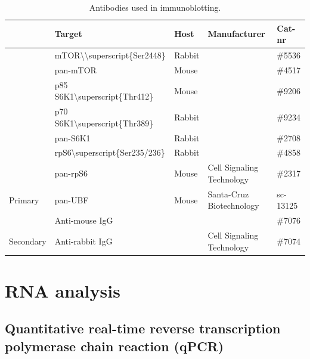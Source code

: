 \documentclass[twoside,10pt]{gihclass} %
\begin{document}
\begin{table}

\caption{\label{tab:primary-antibodies-table}Antibodies used in immunoblotting.}
\centering
\fontsize{7}{9}\selectfont
\begin{tabular}[t]{lllll}
\toprule
 & Target & Host & Manufacturer & Cat-nr\\
\midrule
 & mTOR\textbackslash{}\textbackslash{}superscript\{Ser2448\} & Rabbit &  & \#5536\\

 & pan-mTOR & Mouse &  & \#4517\\

 & p85 S6K1\textbackslash{}superscript\{Thr412\} & Mouse &  & \#9206\\

 & p70 S6K1\textbackslash{}superscript\{Thr389\} & Rabbit &  & \#9234\\

 & pan-S6K1 & Rabbit &  & \#2708\\

 & rpS6\textbackslash{}superscript\{Ser235/236\} & Rabbit &  & \#4858\\

 & pan-rpS6 & Mouse & \multirow{-7}{*}{\raggedright\arraybackslash Cell Signaling Technology} & \#2317\\

\multirow{-8}{*}{\raggedright\arraybackslash Primary} & pan-UBF & Mouse & Santa-Cruz Biotechnology & sc-13125\\
\cmidrule{1-5}
 & Anti-mouse IgG &  &  & \#7076\\

\multirow{-2}{*}{\raggedright\arraybackslash Secondary} & Anti-rabbit IgG &  & \multirow{-2}{*}{\raggedright\arraybackslash Cell Signaling Technology} & \#7074\\
\bottomrule
\end{tabular}
\end{table}
\hypertarget{rna-analysis}{%
\section{RNA analysis}\label{rna-analysis}}

\hypertarget{quantitative-real-time-reverse-transcription-polymerase-chain-reaction-qpcr}{%
\subsection{Quantitative real-time reverse transcription polymerase chain reaction (qPCR)}\label{quantitative-real-time-reverse-transcription-polymerase-chain-reaction-qpcr}}
\end{document}
